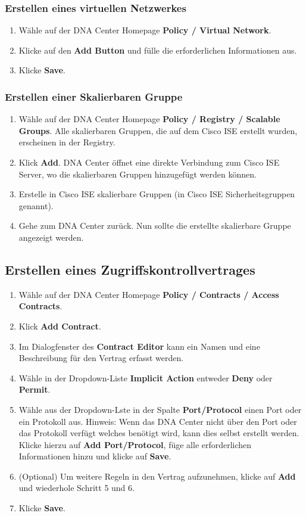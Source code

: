 \subsubsection{Erstellen eines virtuellen Netzwerkes}
\begin{enumerate}
	\item Wähle auf der DNA Center Homepage \textbf{Policy / Virtual Network}.
	\item Klicke auf den \textbf{Add Button} und fülle die erforderlichen Informationen aus.
	\item Klicke \textbf{Save}.
\end{enumerate}

\subsubsection{Erstellen einer Skalierbaren Gruppe}
\begin{enumerate}
	\item Wähle auf der DNA Center Homepage \textbf{Policy / Registry / Scalable Groups}. Alle skalierbaren Gruppen, die auf dem Cisco ISE erstellt wurden, erscheinen in der Registry.
	\item Klick \textbf{Add}. DNA Center öffnet eine direkte Verbindung zum Cisco ISE Server, wo die skalierbaren Gruppen hinzugefügt werden können.
	\item Erstelle in Cisco ISE skalierbare Gruppen (in Cisco ISE Sicherheitsgruppen genannt).
	\item Gehe zum DNA Center zurück. Nun sollte die erstellte skalierbare Gruppe angezeigt werden.
\end{enumerate}

\subsection{Erstellen eines Zugriffskontrollvertrages}
\begin{enumerate}
	\item Wähle auf der DNA Center Homepage \textbf{Policy / Contracts / Access Contracts}.
	\item Klick \textbf{Add Contract}.
	\item Im Dialogfenster des \textbf{Contract Editor} kann ein Namen und eine Beschreibung für den Vertrag erfasst werden.
	\item Wähle in der Dropdown-Liste \textbf{Implicit Action} entweder \textbf{Deny} oder \textbf{Permit}.
	\item Wähle aus der Dropdown-Lste in der Spalte \textbf{Port/Protocol} einen Port oder ein Protokoll aus. Hinweis: Wenn das DNA Center nicht über den Port oder das Protokoll verfügt welches benötigt wird, kann dies selbst erstellt werden. Klicke hierzu auf \textbf{Add Port/Protocol}, füge alle erforderlichen Informationen hinzu und klicke auf \textbf{Save}.
	\item (Optional) Um weitere Regeln in den Vertrag aufzunehmen, klicke auf \textbf{Add} und wiederhole Schritt 5 und 6.
	\item Klicke \textbf{Save}.
\end{enumerate}